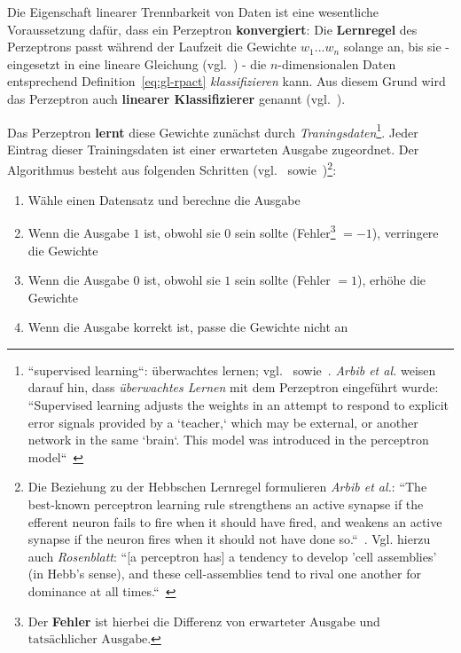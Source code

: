 Die Eigenschaft linearer Trennbarkeit von Daten ist eine wesentliche Voraussetzung dafür, dass ein Perzeptron \textbf{konvergiert}: Die \textbf{Lernregel} des Perzeptrons passt während der Laufzeit die Gewichte $w_1 ... w_n$ solange an, bis sie - eingesetzt in eine lineare Gleichung (vgl.~\cite[311]{Ert21b}) - die $n$-dimensionalen Daten entsprechend Definition~\ref{eq:gl-rpact} \textit{klassifizieren} kann.
Aus diesem Grund wird das Perzeptron auch \textbf{linearer Klassifizierer} genannt (vgl.~\cite[210-216]{Ert21a}).

Das Perzeptron \textbf{lernt} diese Gewichte zunächst durch \textit{Traningsdaten}\footnote{
    ``supervised learning``: überwachtes lernen; vgl.~\cite[811]{RN09} sowie~\cite[15]{Fau94}. \textit{Arbib et al.} weisen darauf hin, dass \textit{überwachtes Lernen} mit dem Perzeptron eingeführt wurde: ``Supervised learning adjusts the weights in an attempt to respond to explicit error signals provided by a `teacher,` which may be external, or another network in the same `brain`. This model was introduced in the perceptron model``~\cite[30]{Arb03}
}.
Jeder Eintrag dieser Trainingsdaten ist einer erwarteten Ausgabe zugeordnet. Der Algorithmus besteht aus folgenden Schritten (vgl.~\cite[65]{RM87} sowie~\cite[842]{RN09})\footnote{
    Die Beziehung zu der Hebbschen Lernregel formulieren \textit{Arbib et al.}:
        ``The best-known perceptron learning rule strengthens an active synapse if the efferent neuron fails to fire when it should have fired, and weakens an active synapse if the neuron fires when it should not have done so.``~\cite[20]{Arb03}.
        Vgl. hierzu auch \textit{Rosenblatt}: ``[a perceptron has] a tendency to develop 'cell assemblies' (in Hebb's sense), and these cell-assemblies tend to rival one another for dominance at all times.``~\cite[464]{Ros62}
}:



\begin{enumerate}
    \item Wähle einen Datensatz und berechne die Ausgabe
    \item Wenn die Ausgabe $1$ ist, obwohl sie $0$ sein sollte (Fehler\footnote{
    Der \textbf{Fehler} ist hierbei die Differenz von $\text{erwarteter Ausgabe}$ und $\text{tatsächlicher Ausgabe}$.
    } $=-1$), verringere die Gewichte
    \item Wenn die Ausgabe $0$ ist, obwohl sie $1$ sein sollte  (Fehler $=1$), erhöhe die Gewichte
    \item Wenn die Ausgabe korrekt ist, passe die Gewichte nicht an
\end{enumerate}


